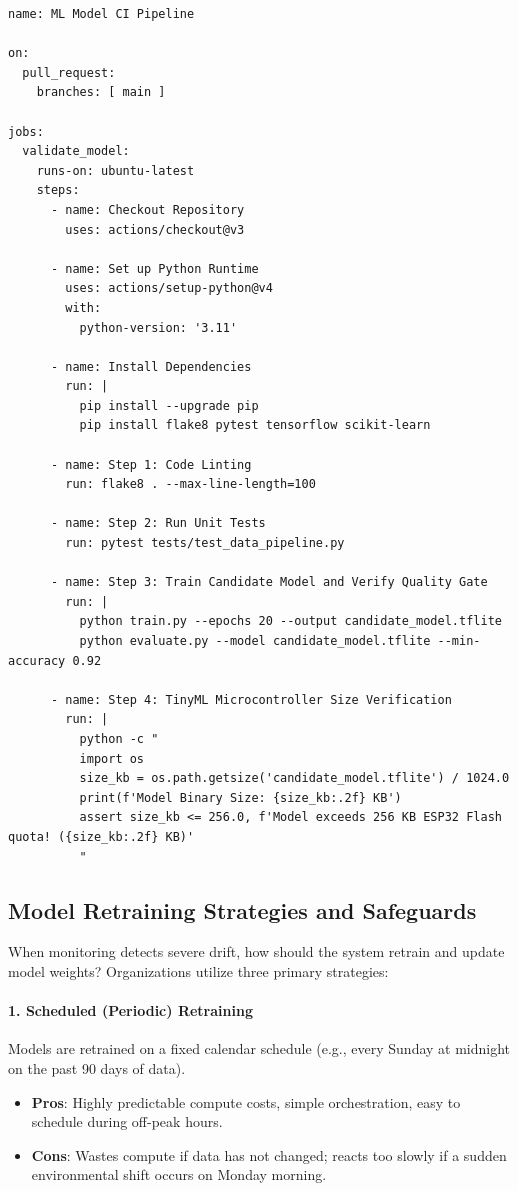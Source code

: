 \begin{lstlisting}[style=pythonstyle, caption={GitHub Actions CI workflow for automated model quality and size verification.}, label={lst:github_actions}]
name: ML Model CI Pipeline

on:
  pull_request:
    branches: [ main ]

jobs:
  validate_model:
    runs-on: ubuntu-latest
    steps:
      - name: Checkout Repository
        uses: actions/checkout@v3

      - name: Set up Python Runtime
        uses: actions/setup-python@v4
        with:
          python-version: '3.11'

      - name: Install Dependencies
        run: |
          pip install --upgrade pip
          pip install flake8 pytest tensorflow scikit-learn

      - name: Step 1: Code Linting
        run: flake8 . --max-line-length=100

      - name: Step 2: Run Unit Tests
        run: pytest tests/test_data_pipeline.py

      - name: Step 3: Train Candidate Model and Verify Quality Gate
        run: |
          python train.py --epochs 20 --output candidate_model.tflite
          python evaluate.py --model candidate_model.tflite --min-accuracy 0.92

      - name: Step 4: TinyML Microcontroller Size Verification
        run: |
          python -c "
          import os
          size_kb = os.path.getsize('candidate_model.tflite') / 1024.0
          print(f'Model Binary Size: {size_kb:.2f} KB')
          assert size_kb <= 256.0, f'Model exceeds 256 KB ESP32 Flash quota! ({size_kb:.2f} KB)'
          "
\end{lstlisting}

\subsection{Model Retraining Strategies and Safeguards}\label{subsec:retraining_strategies}

When monitoring detects severe drift, how should the system retrain and update model weights? Organizations utilize three primary strategies:

\paragraph{1. Scheduled (Periodic) Retraining}
Models are retrained on a fixed calendar schedule (e.g., every Sunday at midnight on the past 90 days of data).
\begin{itemize}
    \item \textbf{Pros}: Highly predictable compute costs, simple orchestration, easy to schedule during off-peak hours.
    \item \textbf{Cons}: Wastes compute if data has not changed; reacts too slowly if a sudden environmental shift occurs on Monday morning.
\end{itemize}

